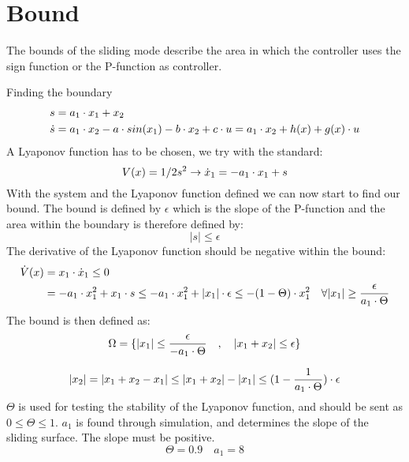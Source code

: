 \section{Bound} %
\label{sec:bound}
The bounds of the sliding mode describe the area in which the controller uses the sign function or the P-function as controller.

Finding the boundary
\begin{equation}
\begin{split}
        s &= a_1 \cdot x_1 + x_2 \\
        \dot{s} &= a_1 \cdot x_2 - a \cdot sin(x_1) - b \cdot x_2 + c \cdot u = a_1 \cdot x_2 + h(x) + g(x) \cdot u
\end{split}
\end{equation}
A Lyaponov function has to be chosen, we try with the standard:
\begin{equation}
        V(x) = 1/2 s^2 \rightarrow \dot{x}_1 = -a_1 \cdot x_1 + s
\end{equation}
With the system and the Lyaponov function defined we can now start to find our bound. The bound is defined by $\epsilon$ which is the slope of the P-function and the area within the boundary is therefore defined by:
\begin{equation}
        \vert s \vert \leq \epsilon
\end{equation}
The derivative of the Lyaponov function should be negative within the bound:
\begin{equation}
        \begin{split}
                \dot{V}(x) &= x_1 \cdot \dot{x}_1 \leq 0 \\
                &= -a_1 \cdot x_1^2 + x_1 \cdot s \leq -a_1 \cdot x_1^2 + |x_1| \cdot \epsilon \leq -(1-\Theta) \cdot x_1^2 \quad \forall |x_1| \geq \frac{\epsilon}{a_1 \cdot \Theta}
        \end{split}
\end{equation}
The bound is then defined as:
\begin{equation}
        \Omega = \{ |x_1| \leq \frac{\epsilon}{-a_1 \cdot \Theta} \quad , \quad |x_1 + x_2| \leq \epsilon \}
\end{equation}

\begin{equation}
        |x_2| = |x_1 + x_2 - x_1| \leq |x_1 + x_2| - |x_1| \leq (1 - \frac{1}{a_1 \cdot \Theta}) \cdot \epsilon
\end{equation}
$\Theta$ is used for testing the stability of the Lyaponov function, and should be sent as $0 \leq \Theta \leq 1$. $a_1$ is found through simulation, and determines the slope of the sliding surface. The slope must be positive.
\begin{equation}
        \Theta = 0.9 \quad a_1 = 8
\end{equation}

